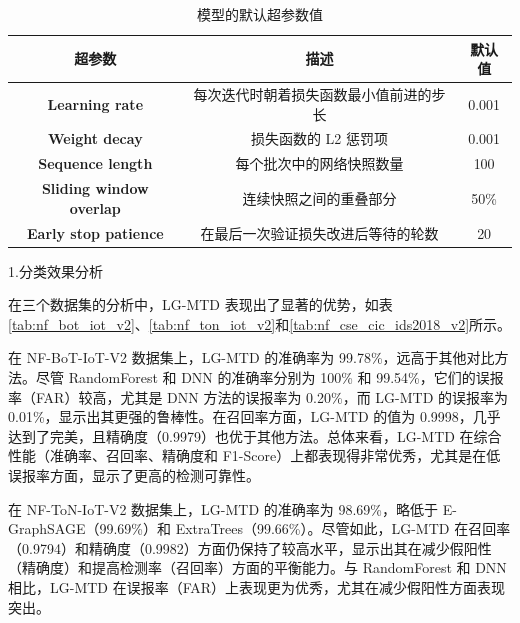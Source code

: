 \documentclass[promaster]{thesis-uestc}
\begin{document}
\begin{table}[h!]
\centering
\caption{模型的默认超参数值}
\begin{tabular}{ c || c c }
\hline\hline
\textbf{超参数} & \textbf{描述} & \textbf{默认值} \\
\hline
\textbf{Learning rate} & 每次迭代时朝着损失函数最小值前进的步长 & 0.001 \\
\hline
\textbf{Weight decay} & 损失函数的 L2 惩罚项 & 0.001 \\
\hline
\textbf{Sequence length} & 每个批次中的网络快照数量 & 100 \\
\hline
\textbf{Sliding window overlap} & 连续快照之间的重叠部分 & 50\% \\
\hline
\textbf{Early stop patience} & 在最后一次验证损失改进后等待的轮数 & 20 \\
\hline\hline
\end{tabular}
\label{Hyperparameters}
\end{table}
1.分类效果分析

在三个数据集的分析中，LG-MTD 表现出了显著的优势，如表\ref{tab:nf_bot_iot_v2}、\ref{tab:nf_ton_iot_v2}和\ref{tab:nf_cse_cic_ids2018_v2}所示。

在 NF-BoT-IoT-V2 数据集上，LG-MTD 的准确率为 99.78\%，远高于其他对比方法。尽管 RandomForest 和 DNN 的准确率分别为 100\% 和 99.54\%，它们的误报率（FAR）较高，尤其是 DNN 方法的误报率为 0.20\%，而 LG-MTD 的误报率为 0.01\%，显示出其更强的鲁棒性。在召回率方面，LG-MTD 的值为 0.9998，几乎达到了完美，且精确度（0.9979）也优于其他方法。总体来看，LG-MTD 在综合性能（准确率、召回率、精确度和 F1-Score）上都表现得非常优秀，尤其是在低误报率方面，显示了更高的检测可靠性。

在 NF-ToN-IoT-V2 数据集上，LG-MTD 的准确率为 98.69\%，略低于 E-GraphSAGE（99.69\%）和 ExtraTrees（99.66\%）。尽管如此，LG-MTD 在召回率（0.9794）和精确度（0.9982）方面仍保持了较高水平，显示出其在减少假阳性（精确度）和提高检测率（召回率）方面的平衡能力。与 RandomForest 和 DNN 相比，LG-MTD 在误报率（FAR）上表现更为优秀，尤其在减少假阳性方面表现突出。
\end{document}
